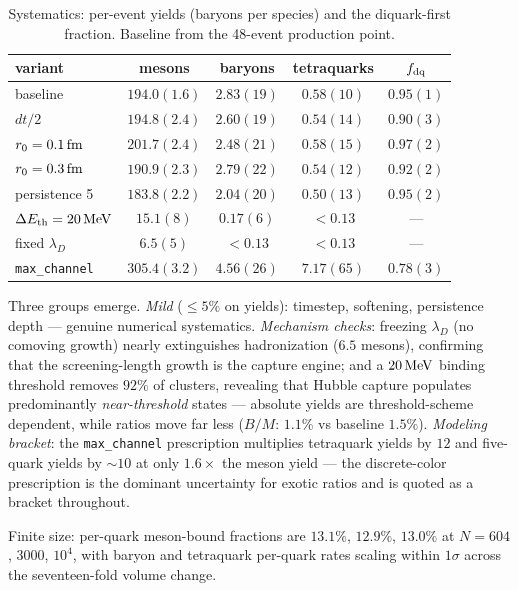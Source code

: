\begin{table}[t]
\caption{Systematics: per-event yields (baryons per species) and the
diquark-first fraction.  Baseline from the 48-event production point.}
\label{tab:syst}
\begin{ruledtabular}
\begin{tabular}{lcccc}
variant & mesons & baryons & tetraquarks & $f_{\rm dq}$ \\
\hline
baseline            & $194.0(1.6)$ & $2.83(19)$ & $0.58(10)$ & $0.95(1)$ \\
$dt/2$              & $194.8(2.4)$ & $2.60(19)$ & $0.54(14)$ & $0.90(3)$ \\
$r_0=0.1\,\mathrm{fm}$        & $201.7(2.4)$ & $2.48(21)$ & $0.58(15)$ & $0.97(2)$ \\
$r_0=0.3\,\mathrm{fm}$        & $190.9(2.3)$ & $2.79(22)$ & $0.54(12)$ & $0.92(2)$ \\
persistence 5       & $183.8(2.2)$ & $2.04(20)$ & $0.50(13)$ & $0.95(2)$ \\
$\Delta E_{\rm th}=20\,\mathrm{MeV}$ & $15.1(8)$ & $0.17(6)$ & $<0.13$ & --- \\
fixed $\lambda_D$   & $6.5(5)$     & $<0.13$    & $<0.13$   & --- \\
\texttt{max\_channel} & $305.4(3.2)$ & $4.56(26)$ & $7.17(65)$ & $0.78(3)$ \\
\end{tabular}
\end{ruledtabular}
\end{table}

Three groups emerge.  \emph{Mild} ($\le5\%$ on yields): timestep,
softening, persistence depth --- genuine numerical systematics.
\emph{Mechanism checks}: freezing $\lambda_D$ (no comoving growth)
nearly extinguishes hadronization ($6.5$ mesons), confirming that the
screening-length growth is the capture engine; and a $20\,\mathrm{MeV}$ binding
threshold removes $92\%$ of clusters, revealing that Hubble capture
populates predominantly \emph{near-threshold} states --- absolute
yields are threshold-scheme dependent, while ratios move far less
($B/M$: $1.1\%$ vs baseline $1.5\%$).  \emph{Modeling bracket}: the
\texttt{max\_channel} prescription multiplies tetraquark yields by
$12$ and five-quark yields by $\sim10$ at only $1.6\times$ the meson
yield --- the discrete-color prescription is the dominant uncertainty
for exotic ratios and is quoted as a bracket throughout.

Finite size: per-quark meson-bound fractions are $13.1\%$, $12.9\%$,
$13.0\%$ at $N=604$, $3000$, $10^4$, with baryon and tetraquark
per-quark rates scaling within $1\sigma$ across the seventeen-fold
volume change.

